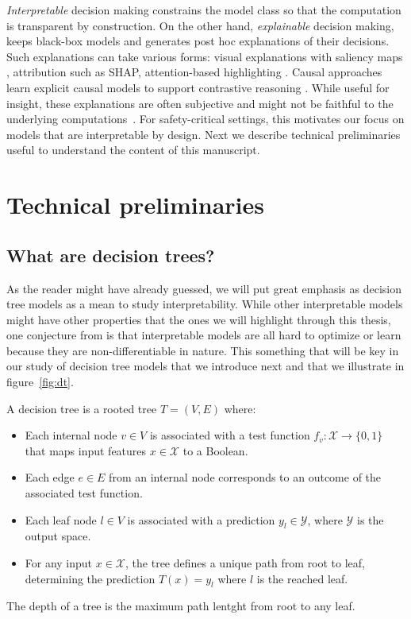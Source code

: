 \textit{Interpretable} decision making constrains the model class so that the computation is transparent by construction. 
On the other hand, \textit{explainable} decision making, keeps black-box models and generates post hoc explanations of their decisions. 
Such explanations can take various forms: visual explanations with saliency maps \cite{Puri2020Explain}, attribution such as SHAP\cite{shap}, attention-based highlighting \cite{attention}.
Causal approaches learn explicit causal models to support contrastive reasoning \cite{madumal}.
While useful for insight, these explanations are often subjective and might not be faithful to the underlying computations~\cite{Atrey2020Exploratory}.
For safety-critical settings, this motivates our focus on models that are interpretable by design.
Next we describe technical preliminaries useful to understand the content of this manuscript.

\section{Technical preliminaries}

\subsection{What are decision trees?}\label{sec:dt}

As the reader might have already guessed, we will put great emphasis as decision tree models as a mean to study interpretability.
While other interpretable models might have other properties that the ones we will highlight through this thesis, one conjecture from \cite{glanois-survey} is that interpretable models are all hard to optimize or learn because they are non-differentiable in nature.
This something that will be key in our study of decision tree models that we introduce next and that we illustrate in figure~\ref{fig:dt}.

\begin{definition}
    A decision tree is a rooted tree $T = (V, E)$ where:
    \begin{itemize}
    \item Each internal node $v \in V$ is associated with a test function $f_v: \mathcal{X} \rightarrow \{0, 1\}$ that maps input features $x \in \mathcal{X}$ to a Boolean.
    \item Each edge $e \in E$ from an internal node corresponds to an outcome of the associated test function.
    \item Each leaf node $l \in V$ is associated with a prediction $y_l \in \mathcal{Y}$, where $\mathcal{Y}$ is the output space.
    \item For any input $x \in \mathcal{X}$, the tree defines a unique path from root to leaf, determining the prediction $T(x) = y_l$ where $l$ is the reached leaf.
    \end{itemize}
    The depth of a tree is the maximum path lentght from root to any leaf.
    \end{definition}

